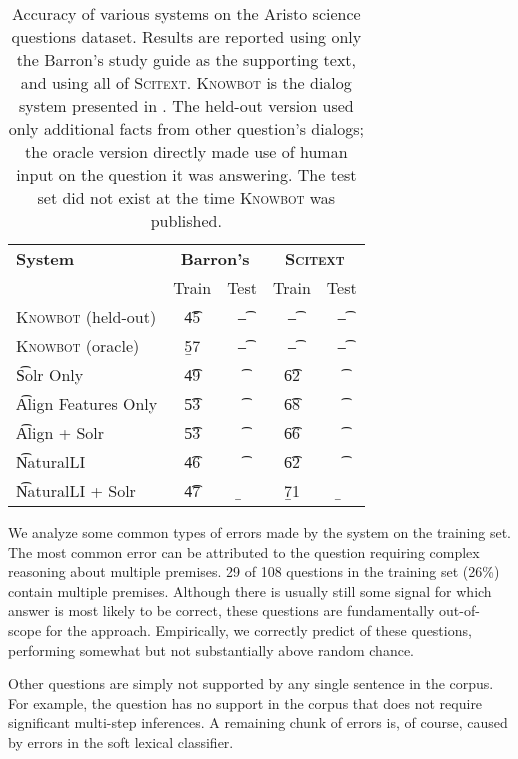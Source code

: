 \begin{table}
\begin{center}
\begin{tabular}{l@{\hskip \colspaceL}c@{\hskip \colspaceS}c@{\hskip \colspaceL}c@{\hskip \colspaceS}c}
\hline
\textbf{System} & \multicolumn{2}{c}{\textbf{Barron's}} & \multicolumn{2}{c}{\textbf{\textsc{Scitext}}} \\
 & Train & Test & Train & Test \\
\hline
\t{\textsc{Knowbot} (held-out)} & \t{45}  & \t{--} & \t{--}  & \t{--} \\
\t{\textsc{Knowbot} (oracle)}   & \b{57}  & \t{--} & \t{--}  & \t{--} \\
\hline                                                         
\t{Solr Only}                   & \t{49}  & \t{  } & \t{62}  & \t{ } \\
\t{Align Features Only}         & \t{53}  & \t{  } & \t{68}  & \t{ } \\
\t{Align + Solr}                & \t{53}  & \t{  } & \t{66}  & \t{ } \\
\hline                                                         
\t{NaturalLI}                   & \t{46}  & \t{  } & \t{62}  & \t{ } \\
\t{NaturalLI + Solr}            & \t{47}  & \b{  } & \b{71}  & \b{ } \\
\hline
\end{tabular}
\end{center}
\caption{
\label{tab:aristonaturalli}
Accuracy of various systems on the Aristo science questions dataset.
Results are reported using only the Barron's study guide as the supporting
  text, and using all of \textsc{Scitext}.
\textsc{Knowbot} is the dialog system presented in .
The held-out version used only additional facts from other question's dialogs;
  the oracle version directly made use of human input on the question it was 
  answering.
The test set did not exist at the time \textsc{Knowbot} was published.
}
\end{table}
%
%

We analyze some common types of errors made by the system on the training set.
The most common error can be attributed to the question requiring complex reasoning
  about multiple premises.
\num{29} of \num{108} questions in the training set (26\%) contain multiple
  premises.
Although there is usually still some signal for which answer is most likely to be correct,
  these questions are fundamentally out-of-scope for the approach.
Empirically, we correctly predict  of these questions, performing somewhat 
  but not substantially above random chance.

Other questions are simply not supported by any single sentence in the corpus.
For example, the question  has
  no support in the corpus that does not require significant multi-step inferences.
A remaining chunk of errors is, of course, caused by errors in the soft lexical classifier.
